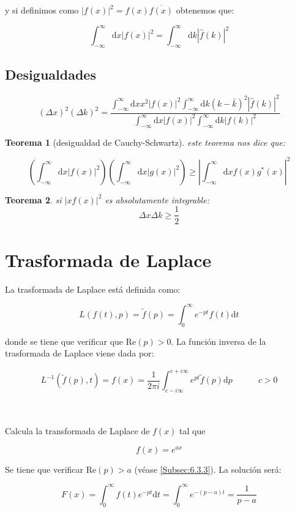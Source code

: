 \documentclass[12pt,a4paper]{book}
\newcommand{\parentesis}[1]{\left( #1  \right)}
\newcommand{\D}{\mathrm{d}}
\newcommand{\Real}{\mathrm{Re}}
\newcommand{\inti}{\int_{-\infty}^{\infty}}
\newcommand{\into}{\int_{0}^{\infty}}
\newcommand{\hatf}{\widehat{f}}
\newcommand{\tf}{\tilde{f}}
\newcommand{\tquad}{\quad  \quad \quad}
\newtheorem{theorem}{Teorema}[section]
\begin{document}
y si definimos como $| f(x)| ^2 = f(x) \overline{f(x)}$ obtenemos que:

\begin{equation}
\inti \D x |f(x)|^2 = \inti \D k |\widehat{f}(k)|^2 
\end{equation}


\subsection{Desigualdades}

\begin{equation}
(\Delta x)^2(\Delta k)^2 = \dfrac{\inti \D x x^2 |f(x)|^2 \inti \D k (k - \bar{k})^2 |\hatf(k)|^2}{\inti \D x |f(x)|^2 \inti \D k |f(k)|^2}
\end{equation}


\begin{theorem}[desigualdad de Cauchy-Schwartz]
este teorema nos dice que:

$$ \parentesis{\inti \D x |f(x)|^2} \parentesis{\inti \D x |g(x)|^2} \geq \left| \inti \D x f(x) g^* (x) \right|^2   $$
\end{theorem}

\begin{theorem}
si $|xf(x)|^2$ es absolutamente integrable:
$$ \Delta x \Delta k \geq \frac{1}{2} $$
\end{theorem}



\section{Trasformada de Laplace}

La trasformada de Laplace está definida como:

\begin{equation}
L(f(t),p) = \tf (p) = \int_0^\infty e^{-pt} f(t) \D t
\end{equation}

donde se tiene que verificar que $\Real (p) > 0$. La función inversa de la trasformada de Laplace viene dada por:

\begin{equation}
L^{-1} (\tf(p),t) = f(x) = \dfrac{1}{2 \pi i} \int_{c- i \infty}^{c+i\infty} e^{pt} \tf (p) \D p \tquad c > 0 
\end{equation} \\


\begin{flushleft}

\hrulefill \\

Calcula la transformada de Laplace de $f(x)$ tal que

$$ f(x) = e^{ax}   $$

Se tiene que verificar $\Real(p)>a$ (véase \ref{Subsec:6.3.3}). La solución será:

$$ F(x) =  \into f(t) e^{-pt} \D t = \into e^{-(p-a)t} = \dfrac{1}{p-a}  $$
\hrulefill \\


\end{flushleft}
\end{document}
